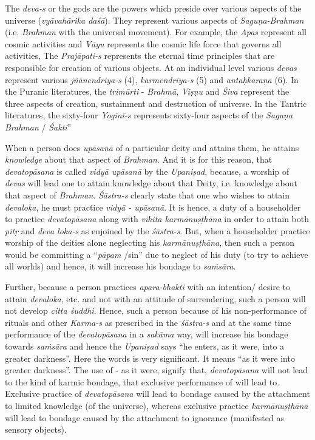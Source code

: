 The \emph{deva-s} or the gods are the powers which preside over various aspects of the universe (\emph{vyāvahārika daśā}). They represent various aspects of \emph{Saguṇa-Brahman} (i.e. \emph{Brahman} with the universal movement). For example, the \emph{Apas} represent all cosmic activities and \emph{Vāyu} represents the cosmic life force that governs all activities, The \emph{Prajāpati-s} represents the eternal time principles that are responsible for creation of various objects. At an individual level various \emph{devas} represent various \emph{jñānendriya-s} (4), \emph{karmendriya-s} (5) and \emph{antaḥkaraṇa} (6). In the Puranic literatures, the \emph{trimūrti} - \emph{Brahmā}, \emph{Viṣṇu} and \emph{Śiva} represent the three aspects of creation, sustainment and destruction of universe. In the Tantric literatures, the sixty-four \emph{Yoginī-s} represents sixty-four aspects of the \emph{Saguṇa Brahman} / \emph{Śakti}''

When a person does \emph{upāsanā} of a particular deity and attains them, he attains \emph{knowledge} about that aspect of \emph{Brahman}. And it is for this reason, that \emph{devatopāsana} is called \emph{vidyā upāsanā} by the \emph{Upaniṣad}, because, a worship of \emph{devas} will lead one to attain knowledge about that Deity, i.e. knowledge about that aspect of \emph{Brahman}. \emph{Śāstra-s} clearly state that one who wishes to attain \emph{devaloka}, he must practice \emph{vidyā - upāsanā}. It is hence, a duty of a householder to practice \emph{devatopāsana} along with \emph{vihita karmānuṣṭhāna} in order to attain both \emph{pitṛ} and \emph{deva loka-s} as enjoined by the \emph{śāstra-s}. But, when a householder practice worship of the deities alone neglecting his \emph{karmānuṣṭhāna}, then such a person would be committing a ``\emph{pāpam} /sin'' due to neglect of his duty (to try to achieve all worlds) and hence, it will increase his bondage to \emph{saṁsāra}.

Further, because a person practices \emph{apara-bhakti} with an intention/ desire to attain \emph{devaloka}, etc. and not with an attitude of surrendering, such a person will not develop \emph{citta śuddhi}. Hence, such a person because of his non-performance of rituals and other \emph{Karma-s} as prescribed in the \emph{śāstra-s} and at the same time performance of the \emph{devatopāsana} in a \emph{sakāma} way, will increase his bondage towards \emph{saṁsāra} and hence the \emph{Upaniṣad} says ``he enters, as it were, into a greater darkness''. Here the words  is very significant. It means ``as it were into greater darkness''. The use of - as it were, signify that, \emph{devatopāsana} will not lead to the kind of karmic bondage, that exclusive performance of will lead to. Exclusive practice of \emph{devatopāsana} will lead to bondage caused by the attachment to limited knowledge (of the universe), whereas exclusive practice \emph{karmānuṣṭhāna} will lead to bondage caused by the attachment to ignorance (manifested as sensory objects).

